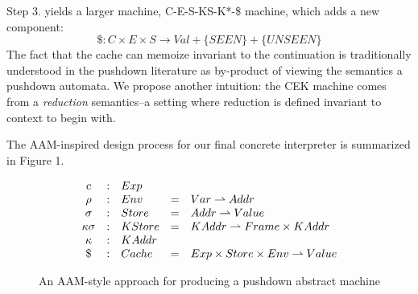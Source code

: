 \documentclass[10pt,letter,english]{article}
\newcommand{\partto}{\rightharpoonup}
\newcommand{\cek}[3]{\langle #1, #2, #3 \rangle}
\newcommand{\cesk}[4]{\langle #1, #2, #3, #4 \rangle}
\newcommand{\cessk}[5]{\langle #1, #2, #3, #4, #5 \rangle}
\newcommand{\cesskc}[6]{\langle #1, #2, #3, #4, #5, #6 \rangle}
\begin{document}
Step 3. yields a larger machine, C-E-S-KS-K*-\$ machine, which adds a new component:
\begin{equation*}
\$ : C \times E \times S \rightarrow Val + \{SEEN\} + \{UNSEEN\}
\end{equation*}
%
The fact that the cache can memoize invariant to the continuation is
traditionally understood in the pushdown literature as by-product of viewing
the semantics a pushdown automata.
%
We propose another intuition: the CEK machine comes from a \emph{reduction}
semantics--a setting where reduction is defined invariant to context to begin
with.

The AAM-inspired design process for our final concrete interpreter is
summarized in Figure 1.

\begin{figure}
\centering

\begin{equation*}
\begin{array}{c c l c l}
  c            &:& Exp        && \\
  \rho         &:& Env        &=& Var   \partto Addr \\
  \sigma       &:& Store      &=& Addr  \partto Value \\
  \kappa\sigma &:& KStore     &=& KAddr \partto Frame \times KAddr \\
  \kappa       &:& KAddr      && \\
  \$         &:& Cache      &=& Exp \times Store \times Env \partto Value
\end{array}
\end{equation*}


\caption{An AAM-style approach for producing a pushdown abstract machine} \label{fig:M1}
\end{figure}
\end{document}
